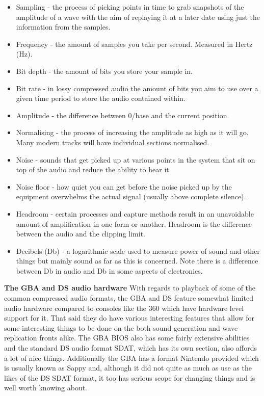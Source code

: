 \documentclass[
]{book}
\providecommand{\tightlist}{%
  \setlength{\itemsep}{0pt}\setlength{\parskip}{0pt}}
\begin{document}
\begin{itemize}
\tightlist
\item
  Sampling - the process of picking points in time to grab snapshots of the amplitude of a wave with the aim of replaying it at a later date using just the information from the samples.
\item
  Frequency - the amount of samples you take per second. Measured in Hertz (Hz).
\item
  Bit depth - the amount of bits you store your sample in.
\item
  Bit rate - in lossy compressed audio the amount of bits you aim to use over a given time period to store the audio contained within.
\item
  Amplitude - the difference between 0/base and the current position.
\item
  Normalising - the process of increasing the amplitude as high as it will go. Many modern tracks will have individual sections normalised.
\item
  Noise - sounds that get picked up at various points in the system that sit on top of the audio and reduce the ability to hear it.
\item
  Noise floor - how quiet you can get before the noise picked up by the equipment overwhelms the actual signal (usually above complete silence).
\item
  Headroom - certain processes and capture methods result in an unavoidable amount of amplification in one form or another. Headroom is the difference between the audio and the clipping limit.
\item
  Decibels (Db) - a logarithmic scale used to measure power of sound and other things but mainly sound as far as this is concerned. Note there is a difference between Db in audio and Db in some aspects of electronics.
\end{itemize}

\textbf{The GBA and DS audio hardware} With regards to playback of some of the common compressed audio formats, the GBA and DS feature somewhat limited audio hardware compared to consoles like the 360 which have hardware level support for it. That said they do have various interesting features that allow for some interesting things to be done on the both sound generation and wave replication fronts alike. The GBA BIOS also has some fairly extensive abilities and the standard DS audio format SDAT, which has its own section, also affords a lot of nice things. Additionally the GBA has a format Nintendo provided which is usually known as Sappy and, although it did not quite as much as use as the likes of the DS SDAT format, it too has serious scope for changing things and is well worth knowing about.
\end{document}
